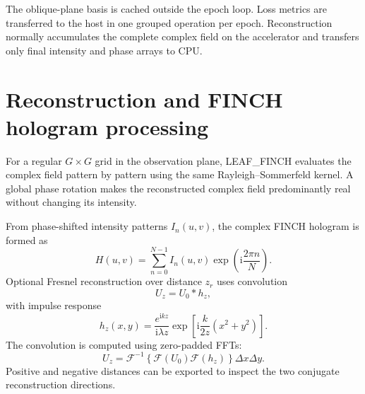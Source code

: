 \documentclass[11pt,a4paper]{article}
\newcommand{\ii}{\mathrm{i}}
\newcommand{\software}{\textsc{LEAF\_FINCH}}
\begin{document}
The oblique-plane basis is cached outside the epoch loop. Loss metrics are transferred to the host in one grouped operation per epoch. Reconstruction normally accumulates the complete complex field on the accelerator and transfers only final intensity and phase arrays to CPU.

\section{Reconstruction and FINCH hologram processing}
For a regular $G\times G$ grid in the observation plane, \software{} evaluates the complex field pattern by pattern using the same Rayleigh--Sommerfeld kernel. A global phase rotation makes the reconstructed complex field predominantly real without changing its intensity.

From phase-shifted intensity patterns $I_n(u,v)$, the complex FINCH hologram is formed as
\begin{equation}
 H(u,v)=\sum_{n=0}^{N-1}I_n(u,v)\exp\!\left(\ii\frac{2\pi n}{N}\right).
 \label{eq:hologram}
\end{equation}
Optional Fresnel reconstruction over distance $z_r$ uses convolution
\begin{equation}
 U_z=U_0*h_z,
\end{equation}
with impulse response
\begin{equation}
 h_z(x,y)=\frac{e^{\ii kz}}{\ii\lambda z}
 \exp\!\left[\ii\frac{k}{2z}(x^2+y^2)\right].
\end{equation}
The convolution is computed using zero-padded FFTs:
\begin{equation}
 U_z=\mathcal F^{-1}\!\left\{\mathcal F(U_0)\mathcal F(h_z)\right\}\Delta x\Delta y.
\end{equation}
Positive and negative distances can be exported to inspect the two conjugate reconstruction directions.
\end{document}
